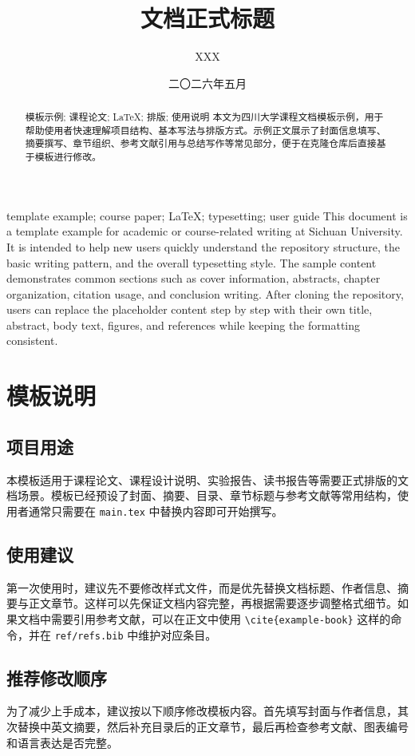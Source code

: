 \documentclass[a4paper]{ctexrep}
\title{文档正式标题}
\author{XXX}
\date{二〇二六年五月}
\begin{document}

\makecover

\begin{abstract}{模板示例; 课程论文; LaTeX; 排版; 使用说明}
本文为四川大学课程文档模板示例，用于帮助使用者快速理解项目结构、基本写法与排版方式。示例正文展示了封面信息填写、摘要撰写、章节组织、参考文献引用与总结写作等常见部分，便于在克隆仓库后直接基于模板进行修改。
\end{abstract}

\begin{abstractEng}{template example; course paper; LaTeX; typesetting; user guide}
This document is a template example for academic or course-related writing at Sichuan University. It is intended to help new users quickly understand the repository structure, the basic writing pattern, and the overall typesetting style. The sample content demonstrates common sections such as cover information, abstracts, chapter organization, citation usage, and conclusion writing. After cloning the repository, users can replace the placeholder content step by step with their own title, abstract, body text, figures, and references while keeping the formatting consistent.
\end{abstractEng}

\tableofcontents

\chapter{模板说明}
\section{项目用途}
本模板适用于课程论文、课程设计说明、实验报告、读书报告等需要正式排版的文档场景。模板已经预设了封面、摘要、目录、章节标题与参考文献等常用结构，使用者通常只需要在 \texttt{main.tex} 中替换内容即可开始撰写。

\section{使用建议}
第一次使用时，建议先不要修改样式文件，而是优先替换文档标题、作者信息、摘要与正文章节。这样可以先保证文档内容完整，再根据需要逐步调整格式细节。如果文档中需要引用参考文献，可以在正文中使用 \verb|\cite{example-book}| 这样的命令，并在 \texttt{ref/refs.bib} 中维护对应条目\cite{example-book}。

\section{推荐修改顺序}
为了减少上手成本，建议按以下顺序修改模板内容。首先填写封面与作者信息，其次替换中英文摘要，然后补充目录后的正文章节，最后再检查参考文献、图表编号和语言表达是否完整。
\end{document}
